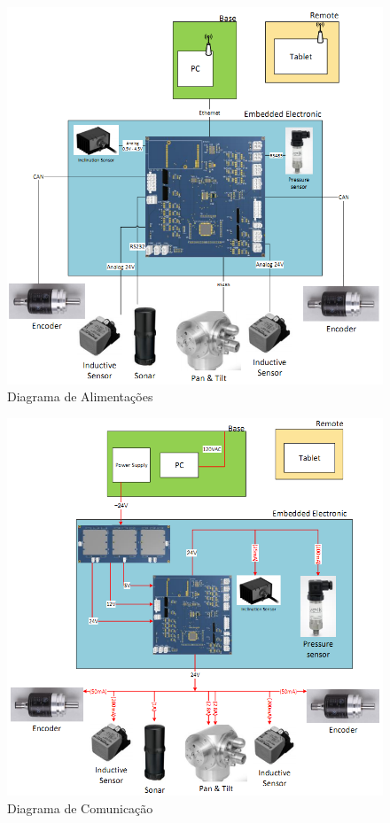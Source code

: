 \begin{figure}[H]
    \centering
    \includegraphics[width=1\columnwidth]{figs/eletronica/2.png}
    \caption{Diagrama de Alimentações}
    \label{alimentacao_placa}
\end{figure}

\begin{figure}[H]
    \centering
    \includegraphics[width=1\columnwidth]{figs/eletronica/3.png}
    \caption{Diagrama de Comunicação}
    \label{com_placa}
\end{figure}
 
